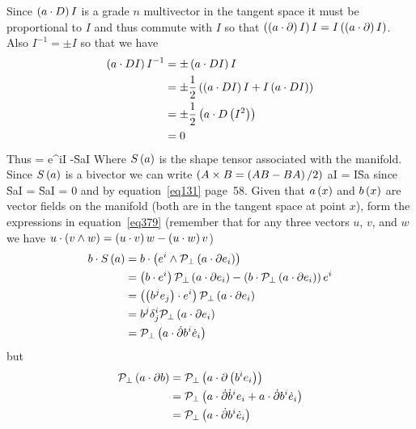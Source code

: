 Since $\left ( {a\cdot D} \right ) I$ is a grade $n$ multivector in the tangent space it must be proportional to $I$ and thus commute with $I$ so that $\left ( {\left ( {a\cdot\partial} \right ) I} \right ) I = I\left ( {\left ( {a\cdot\partial} \right ) I} \right )$. Also
$I^{-1} = \pm I$ so that we have
\begin{align}
 \left ( {a\cdot DI} \right ) I^{-1} &= \pm \left ( {a\cdot DI} \right ) I \nonumber \\
                                &= \pm\displaystyle\frac{1}{2}\left ( {\left ( {a\cdot DI} \right ) I+I\left ( {a\cdot DI} \right )} \right ) \nonumber \\
                                &= \pm\displaystyle\frac{1}{2}\left ( {a\cdot D\left ( {I^{2}} \right )} \right ) \nonumber \\
                                &= 0
\end{align}
Thus
\be\label{eq376}
  = \W e^{i}I \equiv -\f{S}{a}I
\ee
Where ${S}\left ( {a} \right )$ is the shape tensor associated with the manifold.  Since ${S}\left ( {a} \right )$ is a bivector we can write $\left ( {A\times B = \left ( {AB-BA} \right )/2} \right )$
\be\label{eq377}
 a\cdot\partial I = I\times \f{S}{a}
\ee
since
\be
 \f{S}{a}\cdot I = \f{S}{a}\W I = 0
\ee
and by equation~\ref{eq131} page~58.  Given that ${a}\left ( {x} \right )$ and ${b}\left ( {x} \right )$ are vector fields on the manifold (both are in the
tangent space at point $x$), form the expressions in equation~\ref{eq379} (remember that for any three vectors $u$, $v$, and 
$w$ we have $u\cdot\left ( {v\wedge w} \right ) = \left ( {u\cdot v} \right ) w-\left ( {u\cdot w} \right ) v$)
\begin{align}\label{eq379}
 b\cdot{S}\left ( {a} \right ) &= b\cdot\left ( {e^{i}\wedge{\mathcal{P}_{\perp}}\left ( {a\cdot\partial e_{i}} \right )} \right ) \nonumber \\
                &= \left ( {b\cdot e^{i}} \right ){\mathcal{P}_{\perp}}\left ( {a\cdot\partial e_{i}} \right )-\left ( {b\cdot{\mathcal{P}_{\perp}}\left ( {a\cdot\partial e_{i}} \right )} \right ) e^{i} \nonumber \\
                &= \left ( {\left ( {b^{j}e_{j}} \right )\cdot e^{i}} \right ){\mathcal{P}_{\perp}}\left ( {a\cdot\partial e_{i}} \right ) \nonumber \\
                &= b^{j}\delta_{j}^{i}{\mathcal{P}_{\perp}}\left ( {a\cdot\partial e_{i}} \right ) \nonumber \\
                &= {\mathcal{P}_{\perp}}\left ( {a\cdot\dot{\partial} b^{i}\dot{e}_{i}} \right )
\end{align}
but
\begin{align}
 {\mathcal{P}_{\perp}}\left ( {a\cdot\partial b} \right ) &= {\mathcal{P}_{\perp}}\left ( {a\cdot\partial\left ( {b^{i}e_{i}} \right )} \right ) \nonumber \\
                         &= {\mathcal{P}_{\perp}}\left ( {a\cdot\dot{\partial}\dot{b}^{i}e_{i}+a\cdot\dot{\partial}b^{i}\dot{e}_{i}} \right ) \nonumber \\
                         &= {\mathcal{P}_{\perp}}\left ( {a\cdot\dot{\partial}b^{i}\dot{e}_{i}} \right ) 
\end{align}
